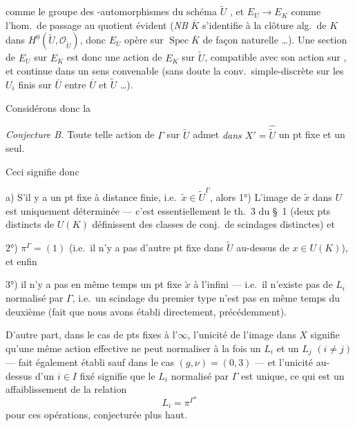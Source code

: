 \documentclass[11pt,a4paper]{article}
\begin{document}
comme le groupe des -automorphismes du schéma $\widetilde{U}$
, et $E_U \to E_K$ comme l'hom.\ de passage au quotient
évident (\emph{NB} $\overline{K}$ s'identifie à la clôture alg.\ de $K$ dans
$H^0(\widetilde{U}, \mathcal{O}_{\widetilde{U}})$, donc $E_U$ opère sur
$\operatorname{Spec}\overline{K}$ de façon naturelle …). Une section de $E_U$
sur $E_K$ est donc une action de $E_K$ sur $\widetilde{U}$, compatible avec son
action sur , et continue dans un sens convenable
(sans doute la conv.\ simple-discrète sur les \struck{\ill{}} $U_i$ finis sur
$\overline{U}$ entre $\overline{U}$ et $\widetilde{U}$ …).

Considérons donc la

\emph{Conjecture B.} Toute telle action de $\Gamma$ sur $\widetilde{U}$ admet
\emph{dans $X' = \widehat{\widetilde{U}}$} un pt fixe et un seul.

Ceci signifie donc

a) S'il y a un pt fixe à distance finie, i.e.\
$\tilde{x} \in \widetilde{U}^{\Gamma}$, alors 1°) L'image de $\tilde{x}$ dans
$U$ est uniquement déterminée — c'est essentiellement le th.~3 du §~1 (deux pts
distincts de $U(K)$ définissent des classes de conj.\ de scindages distinctes) et

2°) $\pi^{\Gamma} = (1)$ (i.e.\ il n'y a pas d'autre pt fixe dans
$\widetilde{U}$ au-dessus de $x \in U(K)$), et enfin

3°) il n'y a pas en même temps un pt fixe \struck{\ill{}} $\tilde{x}$ à
l'infini — i.e.\ il n'existe pas de $L_i$ normalisé par $\Gamma$, i.e.\ un
scindage du premier type n'est pas en même temps du deuxième (fait que nous
avons établi directement, précédemment).

D'autre part, dans le cas de pts fixes à l'$\infty$, l'unicité de l'image dans
$X$ signifie qu'une même action effective ne peut normaliser à la fois un $L_i$
et un $L_j$ $(i \neq j)$ — fait également établi sauf dans le cas
$(g,\nu) = (0,3)$ — et l'unicité au-dessus d'un $i \in I$ fixé 
signifie que le $L_i$ normalisé par $\Gamma$ est unique, ce qui est un
affaiblissement de la relation
\[
  L_i = \pi^{\Gamma^{o}}
\]
pour ces opérations, conjecturée plus haut.
\end{document}
